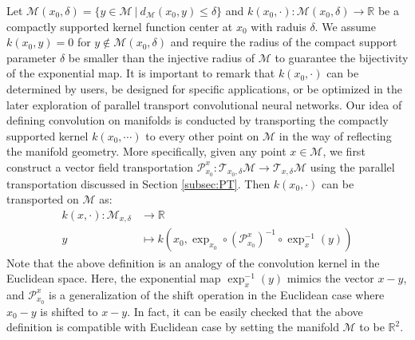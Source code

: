 \documentclass[10pt,twocolumn,letterpaper]{article}
\def\M{\mathcal{M}}
\def\T{\mathcal{T}}
\def\RR{\mathbb{R}}
\def\PT{\mathcal{P}}
\begin{document}
Let $\M(x_0, \delta) = \{y \in \M \ | \ d_{\M}(x_0,y) \leq \delta \}$ and $k(x_0,\cdot): \M(x_0,\delta)\rightarrow \RR$ be a compactly supported kernel function center at $x_0$ with raduis $\delta$. We assume $k(x_0,y) = 0$ for $y \notin \M(x_0,\delta)$ and require the radius of the compact support parameter $\delta$ be smaller than the injective radius of $\M$ to guarantee the bijectivity of the exponential map. It is important to remark that $k(x_0,\cdot)$ can be determined by users, be designed for specific applications, or be optimized in the later exploration of parallel transport convolutional neural networks.
Our idea of defining convolution on manifolds is conducted by transporting the compactly supported kernel $k(x_0,\cdots)$ to every other point on $\M$ in the way of reflecting the manifold geometry.
More specifically, given any point $x\in\M$, we first construct a vector field transportation $\PT_{x_0}^x:\T_{x_0,\delta}\M \rightarrow \T_{x,\delta}\M$ using the parallel transportation discussed in Section \ref{subsec:PT}. Then $k(x_0,\cdot)$ can be transported on $\M$ as:
\begin{equation}
\label{eqn:kernel}
\begin{aligned}
k(x,\cdot):\M_{x,\delta} &\rightarrow  \RR \\
 y & \mapsto  k\left(x_0, \exp_{x_0}\circ (\PT_{x_0}^{x})^{-1}\circ \exp_x^{-1}(y)\right)
\end{aligned}
\end{equation}
Note that the above definition is an analogy of the convolution kernel in the Euclidean space. Here, the exponential map $\exp_x^{-1}(y)$ mimics the vector $x - y$, and $\PT_{x_0}^x$ is a generalization of the shift operation in the Euclidean case where $x_0-y$ is shifted to $x-y$. In fact, it can be easily checked that the above definition is compatible with Euclidean case by setting the manifold $\M$ to be $\RR^2$.
\end{document}
